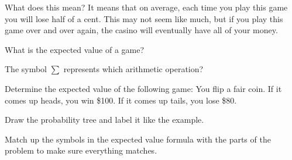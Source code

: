 \documentclass{ximera}
\begin{document}
What does this mean? It means that on average, each time you play this game you will lose half of a cent. This may not seem like much, but if you play this game over and over again, the casino will eventually have all of your money.

\begin{question}
What is the expected value of a game?

    \begin{multipleChoice}
    \end{multipleChoice}

\end{question}

\begin{question}
The symbol $\sum$ represents which arithmetic operation?

    \begin{multipleChoice}
    \end{multipleChoice}

\end{question}

\begin{question}
Determine the expected value of the following game: You flip a fair coin. If it comes up heads, you win \$100. If it comes up tails, you lose \$80.

    \begin{multipleChoice}
    \end{multipleChoice}
    \begin{hint}
      Draw the probability tree and label it like the example.
    \end{hint}
    \begin{hint}
      Match up the symbols in the expected value formula with the parts of the problem to make sure everything matches.
    \end{hint}

\end{question}
\end{document}
